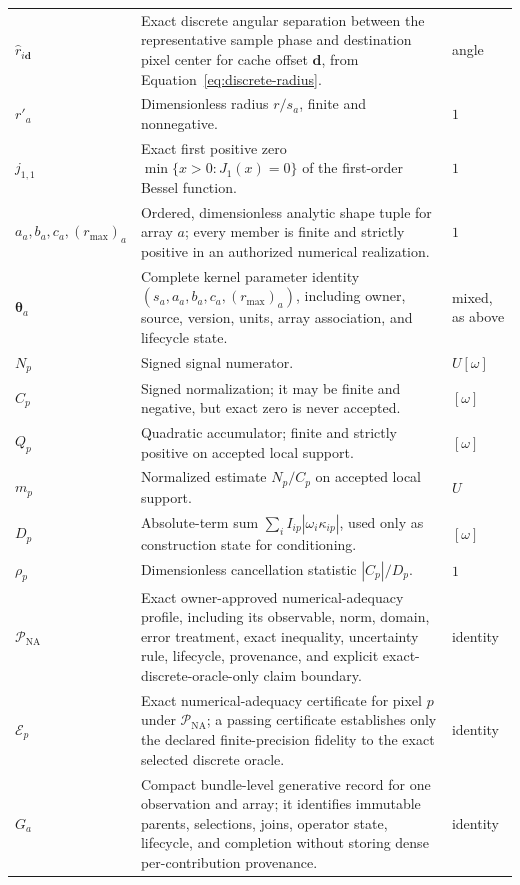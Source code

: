 \begin{longtable}{@{}>{\raggedright\arraybackslash}p{}
                        >{\raggedright\arraybackslash}p{}
                        >{\raggedright\arraybackslash}p{}@{}}
$\widehat r_{i\boldsymbol d}$ & Exact discrete angular separation between the
representative sample phase and destination pixel center for cache offset
$\boldsymbol d$, from Equation~\eqref{eq:discrete-radius}. & angle \\
$r'_a$ & Dimensionless radius $r/s_a$, finite and nonnegative. & $1$ \\
$j_{1,1}$ & Exact first positive zero
$\min\{x>0:J_1(x)=0\}$ of the first-order Bessel function. & $1$ \\
$a_a,\allowbreak b_a,\allowbreak c_a,\allowbreak (r_{\max})_a$ & Ordered, dimensionless analytic shape tuple for
array $a$; every member is finite and strictly positive in an authorized
numerical realization. & $1$ \\
$\boldsymbol{\theta}_a$ & Complete kernel parameter identity
$(s_a,a_a,b_a,c_a,(r_{\max})_a)$, including owner, source, version, units,
array association, and lifecycle state. & mixed, as above \\
$N_p$ & Signed signal numerator. & $U[\omega]$ \\
$C_p$ & Signed normalization; it may be finite and negative, but exact zero is
never accepted. & $[\omega]$ \\
$Q_p$ & Quadratic accumulator; finite and strictly positive on accepted local
support. & $[\omega]$ \\
$m_p$ & Normalized estimate $N_p/C_p$ on accepted local support. & $U$ \\
$D_p$ & Absolute-term sum $\sum_i I_{ip}|\omega_i\kappa_{ip}|$, used only as
construction state for conditioning. & $[\omega]$ \\
$\rho_p$ & Dimensionless cancellation statistic $|C_p|/D_p$. & $1$ \\
$\mathcal{P}_{\mathrm{NA}}$ & Exact owner-approved numerical-adequacy
profile, including its observable, norm, domain, error treatment, exact
inequality, uncertainty rule, lifecycle, provenance, and explicit
exact-discrete-oracle-only claim boundary. & identity \\
$\mathcal{E}_p$ & Exact numerical-adequacy certificate for pixel $p$ under
$\mathcal{P}_{\mathrm{NA}}$; a passing certificate establishes only the
declared finite-precision fidelity to the exact selected discrete oracle. &
identity \\
$G_a$ & Compact bundle-level generative record for one observation and array;
it identifies immutable parents, selections, joins, operator state, lifecycle,
and completion without storing dense per-contribution provenance. & identity \\

\end{longtable}
